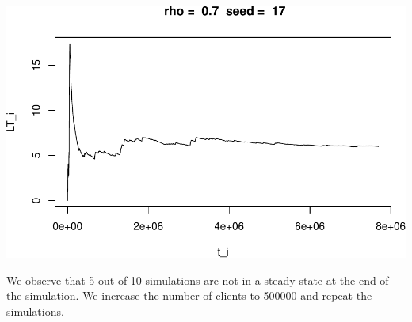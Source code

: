 \documentclass[]{article}
\begin{document}
\includegraphics{003_files/figure-latex/unnamed-chunk-16-10.pdf}

We observe that 5 out of 10 simulations are not in a steady state at the
end of the simulation. We increase the number of clients to 500000 and
repeat the simulations.
\end{document}
